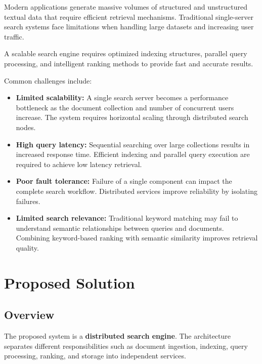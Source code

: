 \documentclass[11pt]{article}
\begin{document}
Modern applications generate massive volumes of structured and unstructured textual data that require efficient retrieval mechanisms. Traditional single-server search systems face limitations when handling large datasets and increasing user traffic.

A scalable search engine requires optimized indexing structures, parallel query processing, and intelligent ranking methods to provide fast and accurate results.

Common challenges include:

\begin{itemize}

\item \textbf{Limited scalability:} A single search server becomes a performance bottleneck as the document collection and number of concurrent users increase. The system requires horizontal scaling through distributed search nodes.

\item \textbf{High query latency:} Sequential searching over large collections results in increased response time. Efficient indexing and parallel query execution are required to achieve low latency retrieval.

\item \textbf{Poor fault tolerance:} Failure of a single component can impact the complete search workflow. Distributed services improve reliability by isolating failures.

\item \textbf{Limited search relevance:} Traditional keyword matching may fail to understand semantic relationships between queries and documents. Combining keyword-based ranking with semantic similarity improves retrieval quality.

\end{itemize}


\section{Proposed Solution}

\subsection{Overview}

The proposed system is a \textbf{distributed search engine}. The architecture separates different responsibilities such as document ingestion, indexing, query processing, ranking, and storage into independent services.
\end{document}
